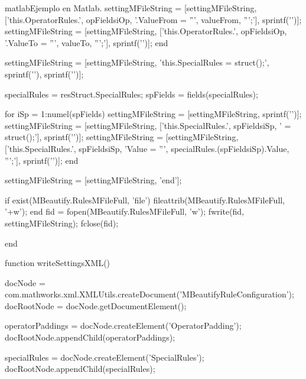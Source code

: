 \begin{sourcecode}{matlab}{Ejemplo en Matlab.}
                settingMFileString = [settingMFileString, ['this.OperatorRules.', opFields{iOp}, '.ValueFrom = ''', valueFrom, ''';'], sprintf('\n')];
                settingMFileString = [settingMFileString, ['this.OperatorRules.', opFields{iOp}, '.ValueTo = ''', valueTo, ''';'], sprintf('\n')];
            end
            
            
            settingMFileString = [settingMFileString, 'this.SpecialRules = struct();', sprintf('\n'), sprintf('\n')];
            
            specialRules = resStruct.SpecialRules;
            spFields = fields(specialRules);
            
            for iSp = 1:numel(spFields)
                settingMFileString = [settingMFileString, sprintf('\n')]; %
                settingMFileString = [settingMFileString, ['this.SpecialRules.', spFields{iSp}, ' = struct();'], sprintf('\n')];
                settingMFileString = [settingMFileString, ['this.SpecialRules.', spFields{iSp}, 'Value = ''', specialRules.(spFields{iSp}).Value, ''';'], sprintf('\n')];
            end
            
            settingMFileString = [settingMFileString, 'end'];
            
            if exist(MBeautify.RulesMFileFull, 'file')
                fileattrib(MBeautify.RulesMFileFull, '+w');
            end
            fid = fopen(MBeautify.RulesMFileFull, 'w');
            fwrite(fid, settingMFileString);
            fclose(fid);
            
        end
        
        
        function writeSettingsXML()
            
            docNode = com.mathworks.xml.XMLUtils.createDocument('MBeautifyRuleConfiguration');
            docRootNode = docNode.getDocumentElement();
            
            operatorPaddings = docNode.createElement('OperatorPadding');
            docRootNode.appendChild(operatorPaddings);
            
            specialRules = docNode.createElement('SpecialRules');
            docRootNode.appendChild(specialRules);
            

\end{sourcecode}
